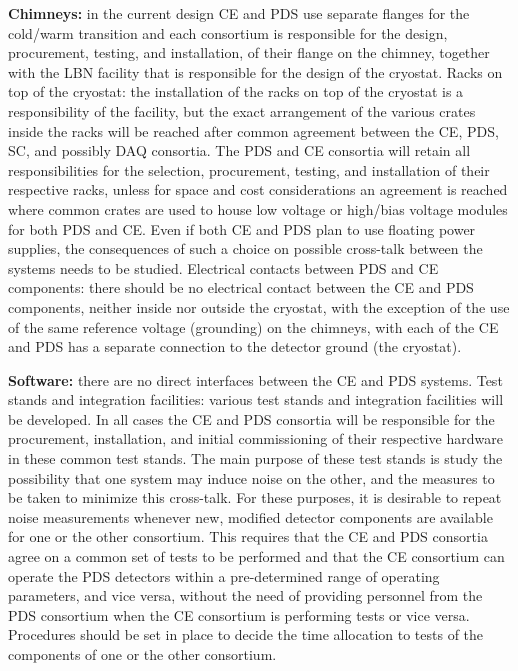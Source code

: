 \textbf{Chimneys: }in the current design CE and PDS use separate flanges for the cold/warm transition and each consortium is responsible for the design, procurement, testing, and installation, of their flange on the chimney, together with the LBN facility that is responsible for the design of the cryostat.
Racks on top of the cryostat: the installation of the racks on top of the cryostat is a responsibility of the facility, but the exact arrangement of the various crates inside the racks will be reached after common agreement between the CE, PDS, SC, and possibly DAQ consortia. The PDS and CE consortia will retain all responsibilities for the selection, procurement, testing, and installation of their respective racks, unless for space and cost considerations an agreement is reached where common crates are used to house low voltage or high/bias voltage modules for both PDS and CE. Even if both CE and PDS plan to use floating power supplies, the consequences of such a choice on possible cross-talk between the systems needs to be studied. 
Electrical contacts between PDS and CE components: there should be no electrical contact between the CE and PDS components, neither inside nor outside the cryostat, with the exception of the use of the same reference voltage (grounding) on the chimneys, with each of the CE and PDS has a separate connection to the detector ground (the cryostat).

\textbf{Software: }there are no direct interfaces between the CE and PDS systems. 
Test stands and integration facilities: various test stands and integration facilities will be developed. In all cases the CE and PDS consortia will be responsible for the procurement, installation, and initial commissioning of their respective hardware in these common test stands. The main purpose of these test stands is study the possibility that one system may induce noise on the other, and the measures to be taken to minimize this cross-talk. For these purposes, it is desirable to repeat noise measurements whenever new, modified detector components are available for one or the other consortium. This requires that the CE and PDS consortia agree on a common set of tests to be performed and that the CE consortium can operate the PDS detectors within a pre-determined range of operating parameters, and vice versa, without the need of providing personnel from the PDS consortium when the CE consortium is performing tests or vice versa. Procedures should be set in place to decide the time allocation to tests of the components of one or the other consortium.

